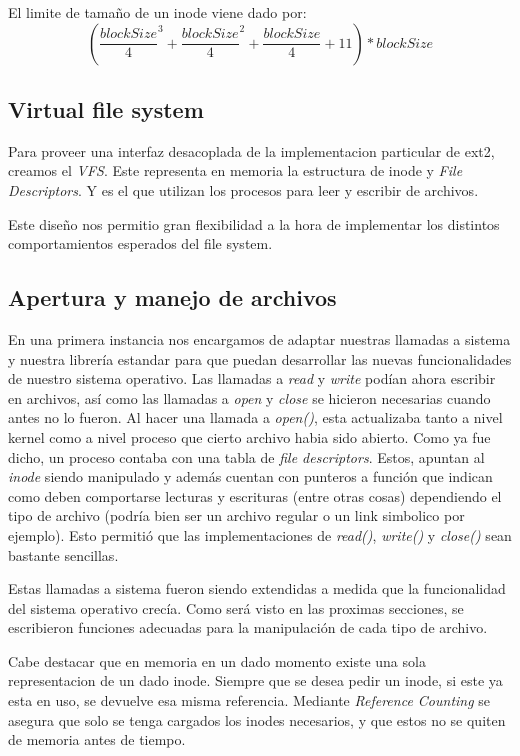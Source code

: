 \documentclass[a4paper,10pt]{article}
\begin{document}
El limite de tamaño de un inode viene dado por:
$$( \frac{blockSize}{4}^3 + \frac{blockSize}{4}^2 + \frac{blockSize}{4} + 11 ) * blockSize $$

\subsection{Virtual file system}

Para proveer una interfaz desacoplada de la implementacion particular de ext2, creamos el \textit{VFS}.
Este representa en memoria la estructura de inode y \textit{File Descriptors}.
Y es el que utilizan los procesos para leer y escribir de archivos.

Este diseño nos permitio gran flexibilidad a la hora de implementar los distintos comportamientos esperados del file system.

\subsection{Apertura y manejo de archivos}
En una primera instancia nos encargamos de adaptar nuestras llamadas a sistema y nuestra librería estandar
para que puedan desarrollar las nuevas funcionalidades de nuestro sistema operativo.
Las llamadas a \textit{read} y \textit{write} podían ahora escribir en archivos, así como las llamadas a \textit{open} y \textit{close} se hicieron
necesarias cuando antes no lo fueron.
Al hacer una llamada a \textit{open()}, esta actualizaba tanto a nivel kernel como a nivel proceso que cierto archivo habia sido abierto. 
Como ya fue dicho, un proceso contaba con una tabla de \textit{file descriptors}. 
Estos, apuntan al \textit{inode} siendo manipulado y además cuentan con punteros a función que indican como deben comportarse lecturas y escrituras (entre otras cosas) dependiendo el tipo de archivo 
(podría bien ser un archivo regular o un link simbolico por ejemplo). 
Esto permitió que las implementaciones de \textit{read()}, \textit{write()} y \textit{close()} sean bastante sencillas. 
    
Estas llamadas a sistema fueron siendo extendidas a medida que la funcionalidad del sistema operativo crecía. 
Como será visto en las proximas secciones, se escribieron funciones adecuadas para la manipulación de cada tipo de archivo.

Cabe destacar que en memoria en un dado momento existe una sola representacion de un dado inode.
Siempre que se desea pedir un inode, si este ya esta en uso, se devuelve esa misma referencia.
Mediante \textit{Reference Counting} se asegura que solo se tenga cargados los inodes necesarios, y que estos no se quiten de memoria antes de tiempo.
\end{document}
